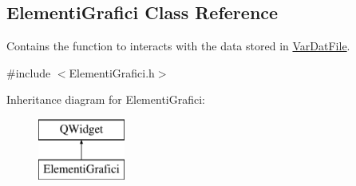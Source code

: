 \hypertarget{classElementiGrafici}{}\subsection{Elementi\+Grafici Class Reference}
\label{classElementiGrafici}


Contains the function to interacts with the data stored in \hyperlink{classVarDatFile}{Var\+Dat\+File}.  




{\ttfamily \#include $<$Elementi\+Grafici.\+h$>$}

Inheritance diagram for Elementi\+Grafici\+:\begin{figure}[H]
\begin{center}
\leavevmode
\includegraphics[height=2.000000cm]{classElementiGrafici}
\end{center}
\end{figure}
